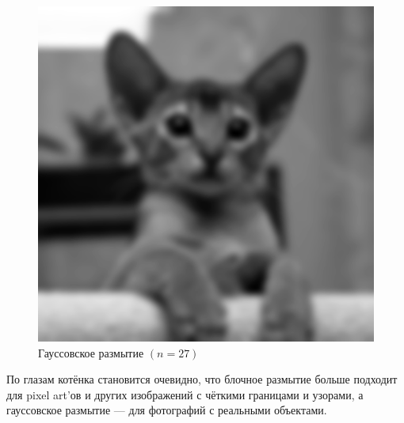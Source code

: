 \documentclass[a4paper]{article}
\begin{document}
\begin{figure}[H]
\begin{minipage}{0.35\textwidth}
        \includegraphics[width=\textwidth]{sources/2second/gauss_27.png}
        \caption{Гауссовское размытие $(n = 27)$}
    \end{minipage}
    \hspace{5em}
\end{figure}
По глазам котёнка становится очевидно, что блочное размытие больше подходит для pixel art'ов и других изображений с чёткими границами и узорами, а гауссовское размытие --- для фотографий с реальными объектами.
\end{document}
